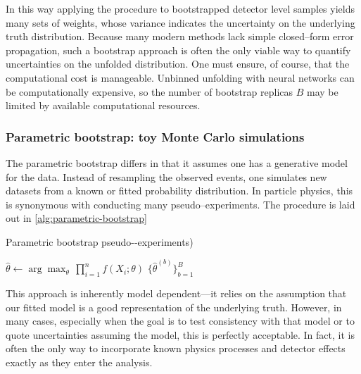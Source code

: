            In this way applying the procedure to bootstrapped detector level samples yields many sets of weights, whose variance indicates the uncertainty on the underlying truth distribution.
           Because many modern methods lack simple closed--form error propagation, such a bootstrap approach is often the only viable way to quantify uncertainties on the unfolded distribution.
           One must ensure, of course, that the computational cost is manageable.
           Unbinned unfolding with neural networks can be computationally expensive, so the number of bootstrap replicas $B$ may be limited by available computational resources.

        \subsubsection{Parametric bootstrap: toy Monte Carlo simulations}
            The parametric bootstrap differs in that it assumes one has a generative model for the data.
            Instead of resampling the observed events, one simulates new datasets from a known or fitted probability distribution.
            In particle physics, this is synonymous with conducting many pseudo--experiments.
            The procedure is laid out in \cref{alg:parametric-bootstrap}
\begin{algorithm}
  \caption{Parametric bootstrap pseudo-‐experiments)}\label{alg:parametric-bootstrap}
  \SetAlgoLined
  \DontPrintSemicolon
  $\hat\theta \leftarrow \displaystyle\arg\max_{\theta}\,\prod_{i=1}^{n}f(X_{i};\theta)$\;
  \Return $\{\hat\theta^{(b)}\}_{b=1}^{B}$\;
\end{algorithm}
            This approach is inherently model dependent---it relies on the assumption that our fitted model is a good representation of the underlying truth.
            However, in many cases, especially when the goal is to test consistency with that model or to quote uncertainties assuming the model, this is perfectly acceptable.
            In fact, it is often the only way to incorporate known physics processes and detector effects exactly as they enter the analysis.

